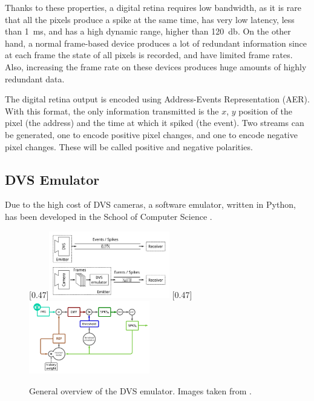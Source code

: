 Thanks to these properties, a digital retina requires low bandwidth, as it is rare that all the pixels produce a spike at the same time, has very low latency, less than \SI{1}{\milli\second}, and has a high dynamic range, higher than \SI{120}{\decibel}. On the other hand, a normal frame-based device produces a lot of redundant information since at each frame the state of all pixels is recorded, and have limited frame rates. Also, increasing the frame rate on these devices produces huge amounts of highly redundant data.

The digital retina output is encoded using Address-Events Representation (AER). With this format, the only information transmitted is the $x$, $y$ position of the pixel (the address) and the time at which it spiked (the event). Two streams can be generated, one to encode positive pixel changes, and one to encode negative pixel changes. These will be called positive and negative polarities.  


\subsection{DVS Emulator}
Due to the high cost of DVS cameras, a software emulator, written in Python, has been developed in the School of Computer Science \cite{Garcia2017}.

\begin{figure}[ht]
\centering
{}
  [0.47\textwidth]{\includegraphics[width=0.47\textwidth]{images/context/dvs_comparison.png}}
  [0.47\textwidth]{\includegraphics[width=0.47\textwidth]{images/context/dvs_diagram.png}}
\caption[DVS Emulator]{General overview of the DVS emulator. Images taken from \cite{Garcia2017}.}
\label{fig:dvs_emulator}
\end{figure}

